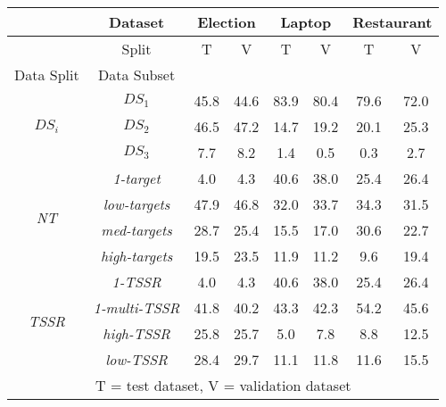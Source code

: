 \begin{tabular}{|c|c|c|c|c|c|c|c|}
\hline
& Dataset & \multicolumn{2}{c|}{Election} & \multicolumn{2}{c|}{Laptop} & \multicolumn{2}{c|}{Restaurant} \\
\hline
& Split &       T &     V &     T &     V &         T &     V \\
\hline
Data Split & Data Subset &          &       &        &       &            &       \\
\hline
\multirow{3}{*}{$DS_i$} & $DS_1$ &     45.8 &  44.6 &   83.9 &  80.4 &       79.6 &  72.0 \\
& $DS_2$ &     46.5 &  47.2 &   14.7 &  19.2 &       20.1 &  25.3 \\
& $DS_3$ &      7.7 &   8.2 &    1.4 &   0.5 &        0.3 &   2.7 \\
\hline
\multirow{4}{*}{\textit{NT}} & \textit{1-target} &      4.0 &   4.3 &   40.6 &  38.0 &       25.4 &  26.4 \\
& \textit{low-targets} &     47.9 &  46.8 &   32.0 &  33.7 &       34.3 &  31.5 \\
& \textit{med-targets} &     28.7 &  25.4 &   15.5 &  17.0 &       30.6 &  22.7 \\
& \textit{high-targets} &     19.5 &  23.5 &   11.9 &  11.2 &        9.6 &  19.4 \\ 
\hline
\multirow{4}{*}{\textit{TSSR}} & \textit{1-TSSR} &      4.0 &   4.3 &   40.6 &  38.0 &       25.4 &  26.4 \\
& \textit{1-multi-TSSR} &     41.8 &  40.2 &   43.3 &  42.3 &       54.2 &  45.6 \\
& \textit{high-TSSR} &     25.8 &  25.7 &   5.0 &  7.8 &       8.8 &  12.5 \\
& \textit{low-TSSR} &     28.4 &  29.7 &   11.1 &  11.8 &        11.6 &  15.5 \\ 
\hline
\multicolumn{8}{|c|}{T = test dataset, V = validation dataset} \\
\hline
\end{tabular}